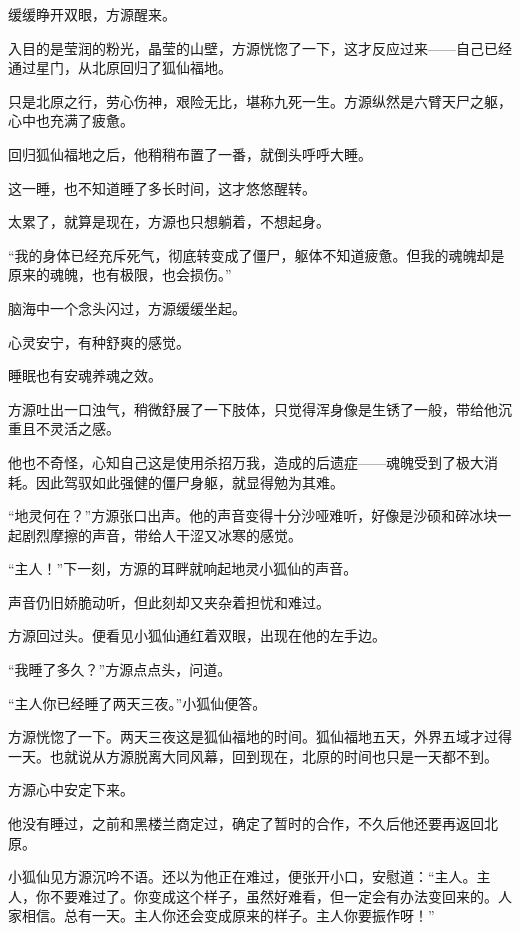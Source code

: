 
\begin{this_body}

缓缓睁开双眼，方源醒来。

入目的是莹润的粉光，晶莹的山壁，方源恍惚了一下，这才反应过来——自己已经通过星门，从北原回归了狐仙福地。

只是北原之行，劳心伤神，艰险无比，堪称九死一生。方源纵然是六臂天尸之躯，心中也充满了疲惫。

回归狐仙福地之后，他稍稍布置了一番，就倒头呼呼大睡。

这一睡，也不知道睡了多长时间，这才悠悠醒转。

太累了，就算是现在，方源也只想躺着，不想起身。

“我的身体已经充斥死气，彻底转变成了僵尸，躯体不知道疲惫。但我的魂魄却是原来的魂魄，也有极限，也会损伤。”

脑海中一个念头闪过，方源缓缓坐起。

心灵安宁，有种舒爽的感觉。

睡眠也有安魂养魂之效。

方源吐出一口浊气，稍微舒展了一下肢体，只觉得浑身像是生锈了一般，带给他沉重且不灵活之感。

他也不奇怪，心知自己这是使用杀招万我，造成的后遗症——魂魄受到了极大消耗。因此驾驭如此强健的僵尸身躯，就显得勉为其难。

“地灵何在？”方源张口出声。他的声音变得十分沙哑难听，好像是沙硕和碎冰块一起剧烈摩擦的声音，带给人干涩又冰寒的感觉。

“主人！”下一刻，方源的耳畔就响起地灵小狐仙的声音。

声音仍旧娇脆动听，但此刻却又夹杂着担忧和难过。

方源回过头。便看见小狐仙通红着双眼，出现在他的左手边。

“我睡了多久？”方源点点头，问道。

“主人你已经睡了两天三夜。”小狐仙便答。

方源恍惚了一下。两天三夜这是狐仙福地的时间。狐仙福地五天，外界五域才过得一天。也就说从方源脱离大同风幕，回到现在，北原的时间也只是一天都不到。

方源心中安定下来。

他没有睡过，之前和黑楼兰商定过，确定了暂时的合作，不久后他还要再返回北原。

小狐仙见方源沉吟不语。还以为他正在难过，便张开小口，安慰道：“主人。主人，你不要难过了。你变成这个样子，虽然好难看，但一定会有办法变回来的。人家相信。总有一天。主人你还会变成原来的样子。主人你要振作呀！”


\end{this_body}
